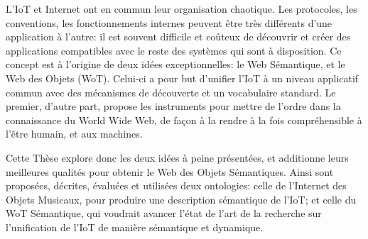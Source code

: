 L'IoT et Internet ont en commun leur organisation chaotique. Les protocoles, les conventions, les fonctionnements internes peuvent \^etre très différents d'une application à l'autre: il est souvent difficile et co\^uteux de découvrir et créer des applications compatibles avec le reste des systèmes qui sont à disposition. Ce concept est à l'origine de deux idées exceptionnelles: le Web Sémantique, et le Web des Objets (WoT). Celui-ci a pour but d'unifier l'IoT à un niveau applicatif commun avec des mécanismes de découverte et un vocabulaire standard. Le premier, d'autre part, propose les instruments pour mettre de l'ordre dans la connaissance du World Wide Web, de façon à la rendre à la fois compréhensible à l'\^etre humain, et aux machines.

Cette Thèse explore donc les deux idées à peine présentées, et additionne leurs meilleures qualités pour obtenir le Web des Objets Sémantiques. Ainsi sont proposées, décrites, évaluées et utilisées deux ontologies: celle de l'Internet des Objets Musicaux, pour produire une description sémantique de l'IoT; et celle du WoT Sémantique, qui voudrait avancer l'état de l'art de la recherche sur l'unification de l'IoT de manière sémantique et dynamique.

